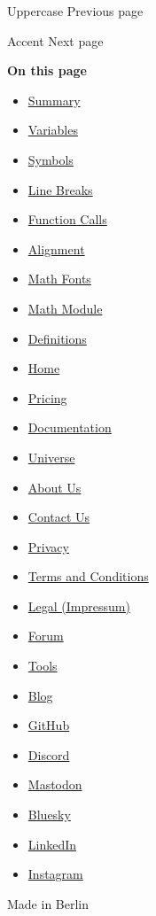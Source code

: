 \href{/docs/reference/text/upper/}{\pandocbounded{}}

{ Uppercase } { Previous page }

\href{/docs/reference/math/accent/}{\pandocbounded{}}

{ Accent } { Next page }

\textbf{On this page}

\begin{itemize}
\tightlist
\item
  \hyperref[summary]{Summary}
\item
  \hyperref[variables]{Variables}
\item
  \hyperref[symbols]{Symbols}
\item
  \hyperref[line-breaks]{Line Breaks}
\item
  \hyperref[function-calls]{Function Calls}
\item
  \hyperref[alignment]{Alignment}
\item
  \hyperref[math-fonts]{Math Fonts}
\item
  \hyperref[math-module]{Math Module}
\item
  \hyperref[definitions]{Definitions}
\end{itemize}

\begin{itemize}
\tightlist
\item
  \href{/}{Home}
\item
  \href{/pricing/}{Pricing}
\item
  \href{/docs/}{Documentation}
\item
  \href{/universe/}{Universe}
\item
  \href{/about/}{About Us}
\item
  \href{/contact/}{Contact Us}
\item
  \href{/privacy/}{Privacy}
\item
  \href{https://typst.app/terms}{Terms and Conditions}
\item
  \href{/legal/}{Legal (Impressum)}
\end{itemize}

\begin{itemize}
\tightlist
\item
  \href{https://forum.typst.app}{Forum}
\item
  \href{/tools/}{Tools}
\item
  \href{/blog/}{Blog}
\item
  \href{https://github.com/typst/}{GitHub}
\item
  \href{https://discord.gg/2uDybryKPe}{Discord}
\item
  \href{https://mastodon.social/@typst}{Mastodon}
\item
  \href{https://bsky.app/profile/typst.app}{Bluesky}
\item
  \href{https://www.linkedin.com/company/typst/}{LinkedIn}
\item
  \href{https://instagram.com/typstapp/}{Instagram}
\end{itemize}

Made in Berlin
